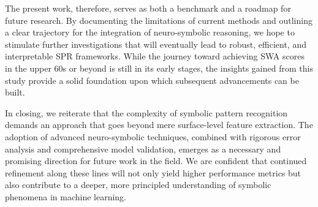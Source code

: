 \documentclass{article}
\begin{document}
The present work, therefore, serves as both a benchmark and a roadmap for future research. By documenting the limitations of current methods and outlining a clear trajectory for the integration of neuro-symbolic reasoning, we hope to stimulate further investigations that will eventually lead to robust, efficient, and interpretable SPR frameworks. While the journey toward achieving SWA scores in the upper 60s or beyond is still in its early stages, the insights gained from this study provide a solid foundation upon which subsequent advancements can be built.

In closing, we reiterate that the complexity of symbolic pattern recognition demands an approach that goes beyond mere surface-level feature extraction. The adoption of advanced neuro-symbolic techniques, combined with rigorous error analysis and comprehensive model validation, emerges as a necessary and promising direction for future work in the field. We are confident that continued refinement along these lines will not only yield higher performance metrics but also contribute to a deeper, more principled understanding of symbolic phenomena in machine learning.
  
\end{document}
